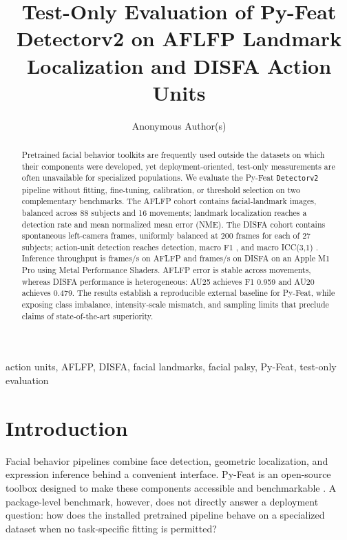 \documentclass[10pt,journal]{IEEEtran}
\title{Test-Only Evaluation of Py-Feat Detectorv2 on AFLFP Landmark
Localization and DISFA Action Units}
\author{Anonymous Author(s)}
\newcommand{\code}[1]{\texttt{#1}}
\begin{document}
\maketitle

\begin{abstract}
Pretrained facial behavior toolkits are frequently used outside the datasets
on which their components were developed, yet deployment-oriented,
test-only measurements are often unavailable for specialized populations.
We evaluate the Py-Feat \code{Detectorv2} pipeline without fitting,
fine-tuning, calibration, or threshold selection on two complementary
benchmarks. The AFLFP cohort contains \AFLFPSamples{} facial-landmark images,
balanced across 88 subjects and 16 movements; landmark localization reaches a
\AFLFPDetection{} detection rate and \AFLFPNMEMean{} mean normalized mean
error (NME). The DISFA cohort contains \DISFASamples{} spontaneous
left-camera frames, uniformly balanced at 200 frames for each of 27 subjects;
action-unit detection reaches \DISFADetection{} detection, macro F1
\DISFAFOne{}, and macro ICC(3,1) \DISFAICC{}. Inference throughput is
\AFLFPFPS{} frames/s on AFLFP and \DISFAFPS{} frames/s on DISFA on an Apple
M1 Pro using Metal Performance Shaders. AFLFP error is stable across
movements, whereas DISFA performance is heterogeneous: AU25 achieves F1
0.959 and AU20 achieves 0.479. The results establish a reproducible external
baseline for Py-Feat, while exposing class imbalance, intensity-scale
mismatch, and sampling limits that preclude claims of state-of-the-art
superiority.
\end{abstract}

\begin{IEEEkeywords}
action units, AFLFP, DISFA, facial landmarks, facial palsy, Py-Feat,
test-only evaluation
\end{IEEEkeywords}

\section{Introduction}

Facial behavior pipelines combine face detection, geometric localization, and
expression inference behind a convenient interface. Py-Feat is an open-source
toolbox designed to make these components accessible and benchmarkable
\cite{cheong2023pyfeat}. A package-level benchmark, however, does not directly
answer a deployment question: how does the installed pretrained pipeline
behave on a specialized dataset when no task-specific fitting is permitted?
\end{document}
